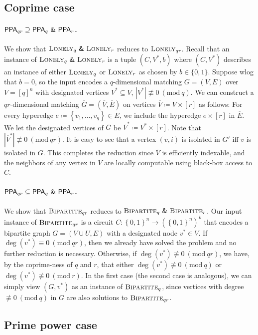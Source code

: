 \documentclass[10pt,a4paper]{article}
\theoremstyle{definition}
\theoremstyle{remark}
\newcommand{\inparen}[1]{\left ( #1 \right )}
\renewcommand{\mod}[1]{~\inparen{\mathrm{mod}~#1}}
\def\set#1{\left\{#1\right\}}
\newcommand{\bit}{\ensuremath{\set{0,1}}}
\newcommand{\class}[1]{\ensuremath{\mathsf{#1}}\xspace}
\newcommand{\PPA}{\class{PPA}}
\newcommand{\lonely}{\ensuremath\textsc{Lonely}}
\newcommand{\bipartite}{\ensuremath{\textsc{Bipartite}}}
\newcommand{\bamp}{~\textsf{\upshape\&}~}
\begin{document}
\subsection{Coprime case} \label{sec:coprime}
\paragraph{\boldmath$\PPA_{qr} \supseteq \PPA_q \bamp\PPA_r$.}
We show that $\lonely_q \bamp\lonely_r$ reduces to $\lonely_{qr}$. Recall that an instance of $\lonely_q \bamp\lonely_r$ is a tuple $(C,V^*, b)$ where $(C,V^*)$ describes an instance of either $\lonely_q$ or $\lonely_r$ as chosen by $b\in\{0,1\}$. Suppose wlog that $b=0$, so the input encodes a $q$-dimensional matching $G = (V,E)$ over $V = [q]^n$ with designated vertices $V^*\subseteq V$, $|V^*| \not\equiv 0 \mod{q}$. We can construct a $qr$-dimensional matching $\overline{G} = (\overline{V},\overline{E})$ on vertices $\overline{V}\coloneqq V \times [r]$ as follows: For every hyperedge $e \coloneqq \set{v_1, \ldots, v_q} \in E$, we include the hyperedge $e \times [r]$ in $\overline{E}$. We let the designated vertices of $\overline{G}$ be $\overline{V}^* \coloneqq V^* \times [r]$. Note that $|\overline{V}^*| \not\equiv 0 \mod{qr}$. It is easy to see that a vertex $(v,i)$ is isolated in $G'$ iff $v$ is isolated in $G$. This completes the reduction since $\overline{V}$ is efficiently indexable, and the neighbors of any vertex in $\overline{V}$ are locally computable using black-box access to $C$. 

\paragraph{\boldmath $\PPA_{qr} \subseteq \PPA_q \bamp\PPA_r$.}
We show that $\bipartite_{qr}$ reduces to $\bipartite_q \bamp\bipartite_r$. Our input instance of $\bipartite_{qr}$ is a circuit $C : \bit^n \to (\bit^n)^k$ that encodes a bipartite graph $G = (V\cup U, E)$ with a designated node $v^* \in V$. If $\deg(v^*) \equiv 0 \mod{qr}$, then we already have solved the problem and no further reduction is necessary. Otherwise, if $\deg(v^*) \not\equiv 0 \mod{qr}$, we have, by the coprime-ness of $q$ and $r$, that either $\deg(v^*) \not\equiv 0 \mod{q}$ or $\deg(v^*) \not\equiv 0 \mod{r}$. In the first case (the second case is analogous), we can simply view $(G,v^*)$ as an instance of $\bipartite_q$, since vertices with degree $\not\equiv 0 \mod{q}$ in $G$ are also solutions to $\bipartite_{qr}$.

\subsection{Prime power case} \label{sec:prime-power}
\end{document}

